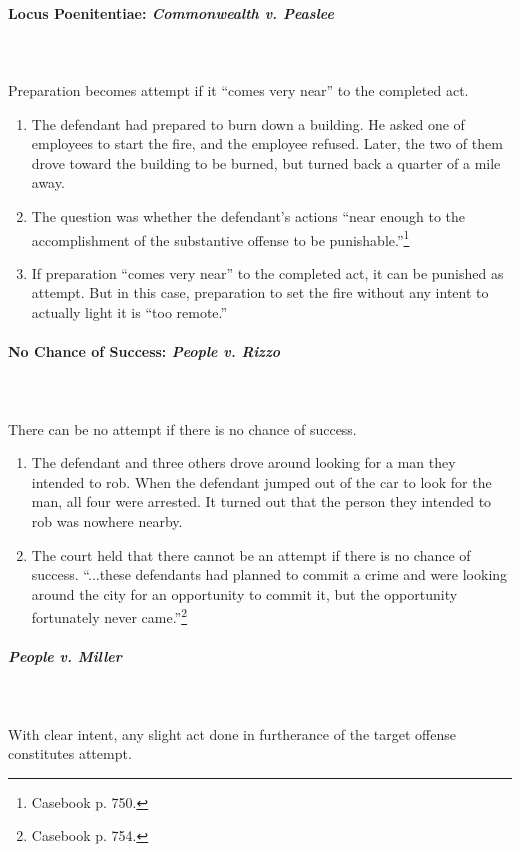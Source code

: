 \paragraph{Locus Poenitentiae: \emph{Commonwealth v. Peaslee}}
~\\\\
Preparation becomes attempt if it ``comes very near'' to the completed act.

\begin{enumerate}
    \item The defendant had prepared to burn down a building. He asked one of 
    employees to start the fire, and the employee refused. Later, the two of 
    them drove toward the building to be burned, but turned back a quarter of 
    a mile away.
    \item The question was whether the defendant's actions ``near enough to 
    the accomplishment of the substantive offense to be 
    punishable.''\footnote{Casebook p. 750.}
    \item If preparation ``comes very near'' to the completed act, it can be 
    punished as attempt. But in this case, preparation to set the fire without 
    any intent to actually light it is ``too remote.''
\end{enumerate}

\paragraph{No Chance of Success: \emph{People v. Rizzo}}
~\\\\
There can be no attempt if there is no chance of success.

\begin{enumerate}
    \item The defendant and three others drove around looking for a man they 
    intended to rob. When the defendant jumped out of the car to look for the 
    man, all four were arrested. It turned out that the person they intended 
    to rob was nowhere nearby.
    \item The court held that there cannot be an attempt if there is no chance 
    of success. ``...these defendants had planned to commit a crime and were 
    looking around the city for an opportunity to commit it, but the 
    opportunity fortunately never came.''\footnote{Casebook p. 754.}
\end{enumerate}

\paragraph{\emph{People v. Miller}}
~\\\\
With clear intent, any slight act done in furtherance of the target offense 
constitutes attempt.

